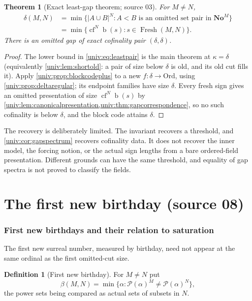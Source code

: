 \documentclass[11pt,letterpaper]{article}
\numberwithin{equation}{section}
\newtheorem{theorem}{Theorem}[section]
\theoremstyle{definition}
\newtheorem{definition}[definition]{Definition}
\theoremstyle{remark}
\newcommand{\No}{\mathbf{No}}
\newcommand{\NoM}{\No^{M}}
\newcommand{\Ord}{\mathrm{Ord}}
\newcommand{\Pow}{\mathcal P}
\newcommand{\bd}{\operatorname{b}}
\newcommand{\cf}{\operatorname{cf}}
\newcommand{\Fresh}{\operatorname{Fresh}}
\newcommand{\abs}[1]{\lvert#1\rvert}
\begin{document}
\begin{theorem}[Exact least-gap theorem; source 03]\label{univ:thm:leastgap}
For $M\ne N$,
\begin{align}
 \delta(M,N)
 &=\min\{\abs{A\cup B}^N:A<B\text{ is an omitted set pair in }\NoM\}
                                                        \label{univ:eq:leastpair}\\
 &=\min\{\cf^N\bd(s):s\in\Fresh(M,N)\}.                  \label{univ:eq:leastfresh}
\end{align}
There is an omitted gap of exact cofinality pair $(\delta,\delta)$.
\end{theorem}
\begin{proof}
The lower bound in \eqref{univ:eq:leastpair} is the main theorem at
$\kappa=\delta$ (equivalently \cref{univ:lem:shortold}: a pair of size below
$\delta$ is old, and its old cut fills it). Apply
\cref{univ:prop:blockcodeplus} to a new $f:\delta\to\Ord$, using
\cref{univ:prop:deltaregular}; its endpoint families have size $\delta$. Every
fresh sign gives an omitted presentation of size $\cf^N\bd(s)$ by
\cref{univ:lem:canonicalpresentation,univ:thm:gapcorrespondence}, so no such
cofinality is below $\delta$, and the block code attains $\delta$.
\end{proof}

The recovery is deliberately limited. The invariant recovers a threshold, and
\cref{univ:cor:gapspectrum} recovers cofinality data. It does not recover the
inner model, the forcing notion, or the actual sign lengths from a bare
ordered-field presentation. Different grounds can have the same threshold,
and equality of gap spectra is not proved to classify the fields.

\part{The first new birthday (source 08)}\label{univ:part:beta}

\section{First new birthdays and their relation to saturation}\label{univ:sec:beta}

The first new surreal number, measured by birthday, need not appear at the
same ordinal as the first omitted-cut size.

\begin{definition}[First new birthday]\label{univ:def:beta}
For $M\ne N$ put
\begin{equation}\label{univ:eq:beta}
 \beta(M,N)=\min\{\alpha:\Pow(\alpha)^M\ne\Pow(\alpha)^N\},
\end{equation}
the power sets being compared as actual sets of subsets in $N$.
\end{definition}
\end{document}
